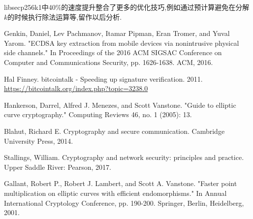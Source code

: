\documentclass{article}
\begin{document}


libsecp256k1中40\%的速度提升整合了更多的优化技巧,例如通过预计算避免在分解$k$的时候执行除法运算等,留作以后分析.

\begin{thebibliography}{99}

Genkin, Daniel, Lev Pachmanov, Itamar Pipman, Eran Tromer, and Yuval Yarom. "ECDSA key extraction from mobile devices via nonintrusive physical side channels." In Proceedings of the 2016 ACM SIGSAC Conference on Computer and Communications Security, pp. 1626-1638. ACM, 2016.

Hal Finney. bitcointalk - Speeding up signature verification. 2011.
\url{https://bitcointalk.org/index.php?topic=3238.0}

Hankerson, Darrel, Alfred J. Menezes, and Scott Vanstone. "Guide to elliptic curve cryptography." Computing Reviews 46, no. 1 (2005): 13.

Blahut, Richard E. Cryptography and secure communication. Cambridge University Press, 2014.

Stallings, William. Cryptography and network security: principles and practice. Upper Saddle River: Pearson, 2017.

Gallant, Robert P., Robert J. Lambert, and Scott A. Vanstone. "Faster point multiplication on elliptic curves with efficient endomorphisms." In Annual International Cryptology Conference, pp. 190-200. Springer, Berlin, Heidelberg, 2001.

\end{thebibliography}
\end{document}
